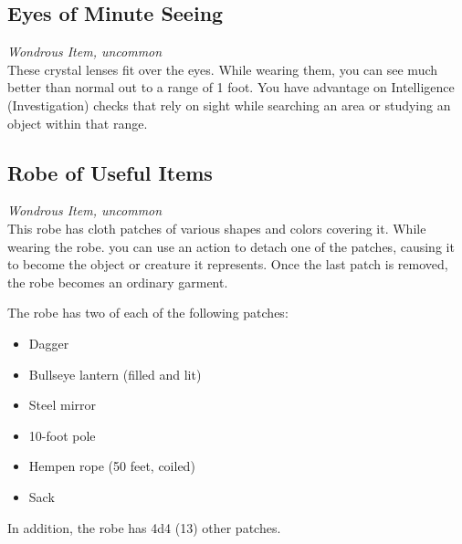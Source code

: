 \documentclass[letterpaper,openany,oneside,twocolumn]{book}
\begin{document}
\subsection*{Eyes of Minute Seeing}
\textit{Wondrous Item, uncommon}\\
These crystal lenses fit over the eyes. While wearing them, you can see much better than normal out to a range of 1 foot. You have advantage on Intelligence (Investigation) checks that rely on sight while searching an area or studying an object within that range.
\subsection*{Robe of Useful Items}
\textit{Wondrous Item, uncommon}\\
This robe has cloth patches of various shapes and colors covering it. While wearing the robe. you can use an action to detach one of the patches, causing it to become the object or creature it represents. Once the last patch is removed, the robe becomes an ordinary garment.

The robe has two of each of the following patches:
\begin{itemize}
	\item Dagger
	\item Bullseye lantern (filled and lit)
	\item Steel mirror
	\item 10-foot pole
	\item Hempen rope (50 feet, coiled)
	\item Sack
\end{itemize}
In addition, the robe has 4d4 (13) other patches.
\end{document}
